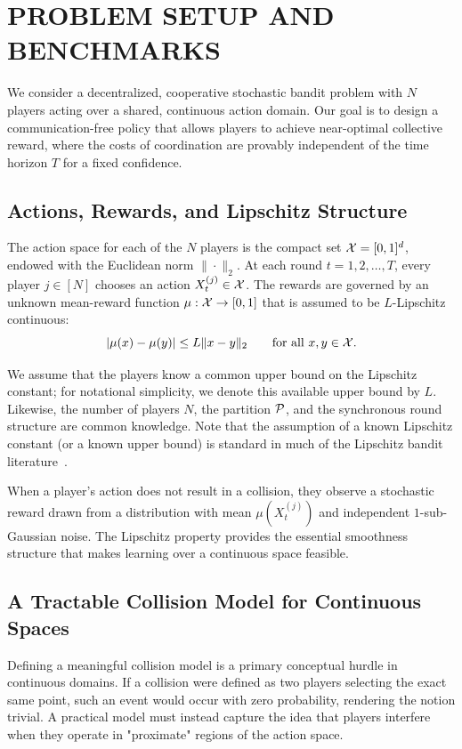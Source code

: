 
\section{PROBLEM SETUP AND BENCHMARKS}
\label{sec:setup}

We consider a decentralized, cooperative stochastic bandit problem with $N$ players acting over a shared, continuous action domain. Our goal is to design a communication-free policy that allows players to achieve near-optimal collective reward, where the costs of coordination are provably independent of the time horizon $T$ for a fixed confidence.


\subsection{Actions, Rewards, and Lipschitz Structure}

The action space for each of the $N$ players is the compact set $\mathcal{X} = [0,1]^d$, endowed with the Euclidean norm $\|\cdot\|_2$. At each round $t=1,2,\dots,T$, every player $j\in[N]$ chooses an action $X_t^{(j)}\in \mathcal{X}$. The rewards are governed by an unknown mean-reward function $\mu:\mathcal{X}\to[0,1]$ that is assumed to be $L$-Lipschitz continuous:
\[
|\mu(x)-\mu(y)| \le L \|x-y\|_2 \qquad \text{for all }x,y\in\mathcal{X} .
\]

We assume that the players know a common upper bound on the Lipschitz constant; for notational simplicity, we denote this available upper bound by $L$. Likewise, the number of players $N$, the partition $\mathcal{P}$, and the synchronous round structure are common knowledge. Note that the assumption of a known Lipschitz constant (or a known upper bound) is standard in much of the Lipschitz bandit literature~\citep{magureanu2014lipschitz,bubeck-xarmed,Kleinberg}.


When a player's action does not result in a collision, they observe a stochastic reward drawn from a distribution with mean $\mu(X_t^{(j)})$ and independent $1$-sub-Gaussian noise. The Lipschitz property provides the essential smoothness structure that makes learning over a continuous space feasible.


\subsection{A Tractable Collision Model for Continuous Spaces}

Defining a meaningful collision model is a primary conceptual hurdle in continuous domains. If a collision were defined as two players selecting the exact same point, such an event would occur with zero probability, rendering the notion trivial. A practical model must instead capture the idea that players interfere when they operate in "proximate" regions of the action space.

